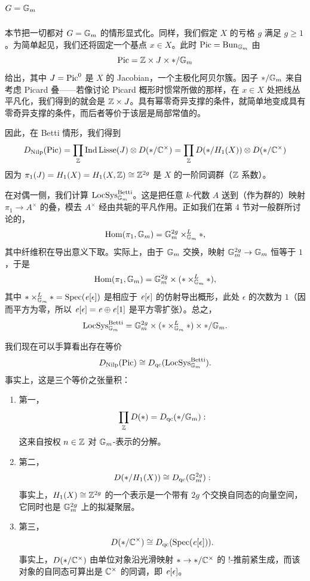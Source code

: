 \section{$G=\mathbb{G}_m$}

本节把一切都对 $G=\mathbb{G}_m$ 的情形显式化。同样，我们假定 $X$ 的亏格 $g$ 满足 $g\ge 1$。为简单起见，我们还将固定一个基点 $x\in X$。此时 $\operatorname{Pic}=\operatorname{Bun}_{\mathbb{G}_m}$ 由
\[ \operatorname{Pic}=\mathbb{Z}\times J\times */\mathbb{G}_m \]
给出，其中 $J=\operatorname{Pic}^{0}$ 是 $X$ 的 Jacobian，一个主极化阿贝尔簇。因子 $*/\mathbb{G}_m$ 来自考虑 Picard 叠——若像讨论 Picard 概形时惯常所做的那样，在 $x\in X$ 处把线丛平凡化，我们得到的就会是 $\mathbb{Z}\times J$。具有幂零奇异支撑的条件，就简单地变成具有零奇异支撑的条件，而后者等价于该层是局部常值的。

因此，在 Betti 情形，我们得到
\[ D_{\mathrm{Nilp}}(\operatorname{Pic})=\prod_{\mathbb{Z}}\operatorname{Ind}\operatorname{Lisse}(J)\otimes D(*/\mathbb{C}^{\times})=\prod_{\mathbb{Z}}D(*/H_{1}(X))\otimes D(*/\mathbb{C}^{\times}) \]
因为 $\pi_{1}(J)=H_{1}(X)=H_{1}(X,\mathbb{Z})\cong\mathbb{Z}^{2g}$ 是 $X$ 的一阶同调群（$\mathbb{Z}$ 系数）。

在对偶一侧，我们计算 $\operatorname{LocSys}^{\mathrm{Betti}}_{\mathbb{G}_m}$。这是把任意 $k$-代数 $A$ 送到（作为群的）映射 $\pi_{1}\to A^{\times}$ 的叠，模去 $A^{\times}$ 经由共轭的平凡作用。正如我们在第 4 节对一般群所讨论的，
\[ \operatorname{Hom}(\pi_{1},\mathbb{G}_m)=\mathbb{G}_m^{2g}\times^{L}_{\mathbb{G}_m}*, \]
其中纤维积在导出意义下取。实际上，由于 $\mathbb{G}_m$ 交换，映射 $\mathbb{G}_m^{2g}\to\mathbb{G}_m$ 恒等于 $1$，于是
\[ \operatorname{Hom}(\pi_{1},\mathbb{G}_m)=\mathbb{G}_m^{2g}\times(*\times^{L}_{\mathbb{G}_m}*), \]
其中 $*\times^{L}_{\mathbb{G}_m}*=\operatorname{Spec}(\mathit{e}[\epsilon])$ 是相应于 $\mathit{e}[\epsilon]$ 的仿射导出概形，此处 $\epsilon$ 的次数为 $1$（因而平方为零，所以 $\mathit{e}[\epsilon]=\mathit{e}\oplus\mathit{e}[1]$ 是平方零扩张）。总之，
\[ \operatorname{LocSys}^{\mathrm{Betti}}_{\mathbb{G}_m}=\mathbb{G}_m^{2g}\times(*\times^{L}_{\mathbb{G}_m}*)\times*/\mathbb{G}_m. \]

我们现在可以手算看出存在等价
\[ D_{\mathrm{Nilp}}(\operatorname{Pic})\cong D_{\mathrm{qc}}(\operatorname{LocSys}^{\mathrm{Betti}}_{\mathbb{G}_m}). \]
事实上，这是三个等价之张量积：

\begin{enumerate}
\item 第一，
\[ \prod_{\mathbb{Z}}D(*)=D_{\mathrm{qc}}(*/\mathbb{G}_m): \]
这来自按权 $n\in\mathbb{Z}$ 对 $\mathbb{G}_m$-表示的分解。

\item 第二，
\[ D(*/H_{1}(X))\cong D_{\mathrm{qc}}(\mathbb{G}_m^{2g}): \]
事实上，$H_{1}(X)\cong\mathbb{Z}^{2g}$ 的一个表示是一个带有 $2g$ 个交换自同态的向量空间，它同时也是 $\mathbb{G}_m^{2g}$ 上的拟凝聚层。

\item 第三，
\[ D(*/\mathbb{C}^{\times})\cong D_{\mathrm{qc}}(\operatorname{Spec}(\mathit{e}[\epsilon])). \]
事实上，$D(*/\mathbb{C}^{\times})$ 由单位对象沿光滑映射 $*\to*/\mathbb{C}^{\times}$ 的 $!$-推前紧生成，而该对象的自同态可算出是 $\mathbb{C}^{\times}$ 的同调，即 $\mathit{e}[\epsilon]$。
\end{enumerate}

